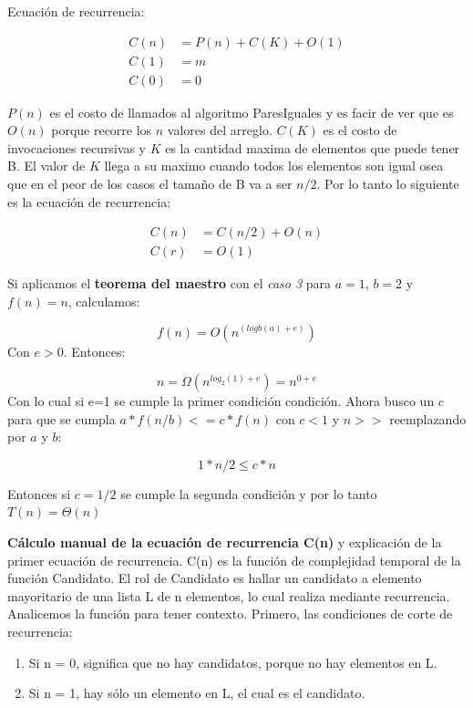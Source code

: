 \documentclass{article}
\begin{document}
Ecuación de recurrencia:

\begin{equation} \label{eq1}
    \begin{split}
        C(n) & = P(n) + C(K) + O(1) \\
        C(1) & = m \\
        C(0) & = 0
    \end{split} 
\end{equation}


\(P(n)\) es el costo de llamados al algoritmo ParesIguales y es facir de ver que es \(O(n)\) porque recorre los \(n\) valores del arreglo. 
\(C(K)\) es el costo de invocaciones recursivas y \(K\) es la cantidad maxima de elementos que puede tener B. 
El valor de \(K\) llega a su maximo cuando todos los elementos son igual osea que en el peor de los casos el tamaño de B va a ser \(n/2\). Por lo tanto lo siguiente es la ecuación de recurrencia:

\begin{equation} \label{eq1}
    \begin{split}
        C(n) &= C(n/2) + O(n) \\
        C(r) &= O(1)
    \end{split} 
\end{equation}


Si aplicamos el \textbf{teorema del maestro} con el \textit{caso 3} para \(a=1\), \(b=2\) y \(f(n)=n\), calculamos:

\[
    f(n) = O(n^{(logb(a) + e)}) 
\]
Con \(e>0\). Entonces:

\[
    n =  \Omega(n^{log_2(1) + e} ) = n^{0 + e}
\]
Con lo cual si e=1 se cumple la primer condición condición. Ahora busco un \(c\) para que se cumpla \(a*f(n/b) <= c*f(n)\) con \(c < 1\) y \(n>>\) reemplazando por \(a\) y \(b\):

\[
    1*n/2 \leq c * n    
\]

Entonces si \(c=1/2\) se cumple la segunda condición y por lo tanto \(T(n) = \Theta(n)\)

\textbf{Cálculo manual de la ecuación de recurrencia C(n)} y explicación de la primer ecuación de recurrencia.
C(n) es la función de complejidad temporal de la función Candidato. El rol de Candidato es hallar un candidato a elemento mayoritario de una lista L de n elementos, lo cual realiza mediante recurrencia. 
Analicemos la función para tener contexto. Primero, las condiciones de corte de recurrencia:

\begin{enumerate}
    \item Si n = 0, significa que no hay candidatos, porque no hay elementos en L.
    \item Si n = 1, hay sólo un elemento en L, el cual es el candidato.
\end{enumerate}
\end{document}
